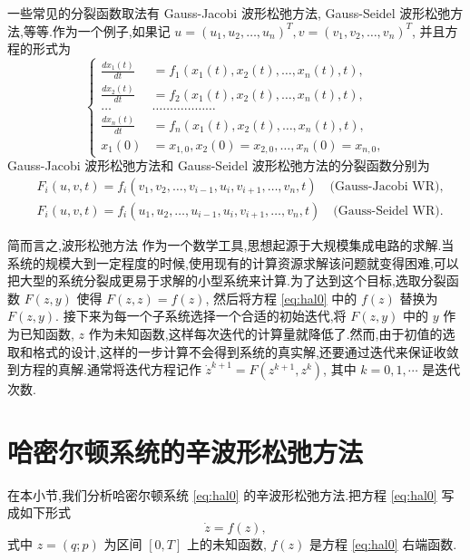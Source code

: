 一些常见的分裂函数取法有 Gauss-Jacobi 波形松弛方法, Gauss-Seidel 波形松弛方法,等等.作为一个例子,如果记 $u=(u_{1},u_{2},\ldots,u_{n})^{T}, v=(v_{1},v_{2},\ldots,v_{n})^{T}$, 并且方程的形式为
\begin{equation*}
\left\{
\begin{aligned}
\frac{dx_{1}(t)}{dt}&=f_{1}(x_{1}(t),x_{2}(t),\ldots,x_{n}(t),t),\\
\frac{dx_{2}(t)}{dt}&=f_{2}(x_{1}(t),x_{2}(t),\ldots,x_{n}(t),t),\\
\ldots&\ldots\ldots\ldots\ldots\ldots\ldots\\
\frac{dx_{n}(t)}{dt}&=f_{n}(x_{1}(t),x_{2}(t),\ldots,x_{n}(t),t),\\
x_{1}(0)&=x_{1,0},x_{2}(0)=x_{2,0},\ldots,x_{n}(0)=x_{n,0},
\end{aligned}
\right.
\end{equation*}
Gauss-Jacobi 波形松弛方法和 Gauss-Seidel 波形松弛方法的分裂函数分别为
\begin{align}\label{eq:wr}
&F_{i}(u,v,t)=f_{i}(v_{1},v_{2},\ldots,v_{i-1},u_{i},v_{i+1},\ldots,v_{n},t)\quad \text{(Gauss-Jacobi~WR)},\\
&F_{i}(u,v,t)=f_{i}(u_{1},u_{2},\ldots,u_{i-1},u_{i},v_{i+1},\ldots,v_{n},t)\quad \text{(Gauss-Seidel~WR)}.
\end{align}

简而言之,波形松弛方法 \cite{jiang2009wr} 作为一个数学工具,思想起源于大规模集成电路的求解.当系统的规模大到一定程度的时候,使用现有的计算资源求解该问题就变得困难,可以把大型的系统分裂成更易于求解的小型系统来计算.为了达到这个目标,选取分裂函数 $F(z,y)$ 使得 $F(z,z)=f(z)$, 然后将方程 \eqref{eq:hal0} 中的 $f(z)$ 替换为 $F(z,y)$. 接下来为每一个子系统选择一个合适的初始迭代,将 $F(z,y)$ 中的 $y$ 作为已知函数, $z$ 作为未知函数,这样每次迭代的计算量就降低了.然而,由于初值的选取和格式的设计,这样的一步计算不会得到系统的真实解,还要通过迭代来保证收敛到方程的真解.通常将迭代方程记作 $\dot{z}^{k+1}=F(z^{k+1},z^{k})$, 其中 $k=0,1,\cdots$ 是迭代次数.


\section{哈密尔顿系统的辛波形松弛方法}\label{sec:03wrhal}
在本小节,我们分析哈密尔顿系统 \eqref{eq:hal0} 的辛波形松弛方法.把方程 \eqref{eq:hal0} 写成如下形式
\begin{equation}\label{eq:hal1}
\dot{z}=f(z),
\end{equation}
式中 $z=(q;p)$ 为区间 $[0,T]$ 上的未知函数, $f(z)$ 是方程 \eqref{eq:hal0} 右端函数.

